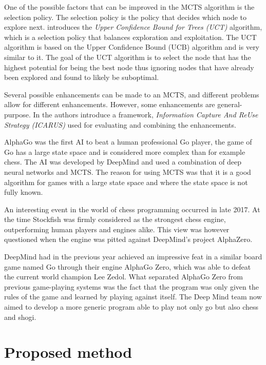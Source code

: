 \documentclass[a4paper,12pt]{article}
\begin{document}
One of the possible factors that can be improved in the MCTS algorithm is the selection policy. The selection policy is the policy that decides which node to explore next. \cite{kocsis2006bandit} introduces the \textit{Upper Confidence Bound for Trees (UCT)} algorithm, which is a selection policy that balances exploration and exploitation. The UCT algorithm is based on the Upper Confidence Bound (UCB) algorithm and is very similar to it. The goal of the UCT algorithm is to select the node that has the highest potential for being the best node thus ignoring nodes that have already been explored and found to likely be suboptimal.


Several possible enhancements can be made to an MCTS, and different problems allow for different enhancements. However, some enhancements are general-purpose. In \cite{POWLEY201492} the authors introduce a framework, \textit{Information Capture And ReUse Strategy (ICARUS)} used for evaluating and combining the enhancements. 


AlphaGo was the first AI to beat a human professional Go player, the game of Go has a large state space and is considered more complex than for example chess. The AI was developed by DeepMind and used a combination of deep neural networks and MCTS. The reason for using MCTS was that it is a good algorithm for games with a large state space and where the state space is not fully known. %


An interesting event in the world of chess programming occurred in late 2017. At the time Stockfish was firmly considered as the strongest chess engine, outperforming human players and engines alike. This view was however questioned when the engine was pitted against DeepMind’s project AlphaZero. \cite{chess.com_stockfish}

DeepMind had in the previous year achieved an impressive feat in a similar board game named Go through their engine AlphaGo Zero, which was able to defeat the current world champion Lee Zedol. What separated AlphaGo Zero from previous game-playing systems was the fact that the program was only given the rules of the game and learned by playing against itself. The Deep Mind team now aimed to develop a more generic program able to play not only go but also chess and shogi. \cite{doi:10.1126/science.aar6404}



\section{Proposed method}
\label{sec:method}
\end{document}
